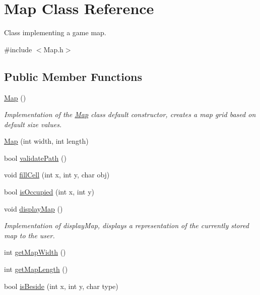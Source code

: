 \hypertarget{classMap}{}\section{Map Class Reference}
\label{classMap}


Class implementing a game map.  




{\ttfamily \#include $<$Map.\+h$>$}

\subsection*{Public Member Functions}
\begin{DoxyCompactItemize}
\item 
\hypertarget{classMap_a0f5ad0fd4563497b4214038cbca8b582}{}\label{classMap_a0f5ad0fd4563497b4214038cbca8b582} 
\hyperlink{classMap_a0f5ad0fd4563497b4214038cbca8b582}{Map} ()
\begin{DoxyCompactList}\small\item\em Implementation of the \hyperlink{classMap}{Map} class default constructor, creates a map grid based on default size values. \end{DoxyCompactList}\item 
\hyperlink{classMap_a1d58d9a6724d335f6173cdd4065af24a}{Map} (int width, int length)
\item 
bool \hyperlink{classMap_a91d9e239a9871b99a5d6d2d5d46b0504}{validate\+Path} ()
\item 
void \hyperlink{classMap_a96c5c1d56e2b58c2ea81f49106e20b3c}{fill\+Cell} (int x, int y, char obj)
\item 
bool \hyperlink{classMap_a79e5ced99d160ca9b680661169f16d84}{is\+Occupied} (int x, int y)
\item 
\hypertarget{classMap_ac5af28a5fed55d9ca5d1dab5cb9f3f9c}{}\label{classMap_ac5af28a5fed55d9ca5d1dab5cb9f3f9c} 
void \hyperlink{classMap_ac5af28a5fed55d9ca5d1dab5cb9f3f9c}{display\+Map} ()
\begin{DoxyCompactList}\small\item\em Implementation of display\+Map, displays a representation of the currently stored map to the user. \end{DoxyCompactList}\item 
int \hyperlink{classMap_a286853d8475bc1bbede582c89e9b1491}{get\+Map\+Width} ()
\item 
int \hyperlink{classMap_aad03e74940d81cf9307bb0dae7e8814b}{get\+Map\+Length} ()
\item 
bool \hyperlink{classMap_a7ba2837b589493924b726dc326d68e8e}{is\+Beside} (int x, int y, char type)
\end{DoxyCompactItemize}



